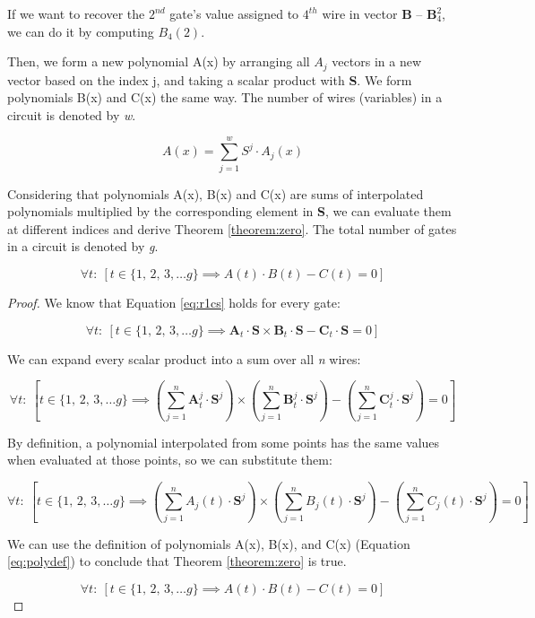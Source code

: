 \begin{exmp}
\label{ex:recover}
If we want to recover the $2^{nd}$ gate's value assigned to $4^{th}$ wire in vector \textbf{B} -- $\textbf{B}_4^2$, we can do it by computing $B_4(2)$.
\end{exmp}

\noindent Then, we form a new polynomial A(x) by arranging all $A_j$ vectors in a new vector based on the index j, and taking a scalar product with \textbf{S}. We form polynomials B(x) and C(x) the same way. The number of wires (variables) in a circuit is denoted by \textit{w}.

\begin{equation}
    \label{eq:polydef}
A(x) = \sum_{j = 1}^{w} S^j \cdot A_j(x)
\end{equation}

\noindent Considering that polynomials A(x), B(x) and C(x) are sums of interpolated polynomials multiplied by the corresponding element in \textbf{S}, we can evaluate them at different indices and derive Theorem \ref{theorem:zero}. The total number of gates in a circuit is denoted by \textit{g}.



\begin{theorem}
    \label{theorem:zero}
    $$\forall t:\: [t \in \{1,\,2,\,3, \dots g\} \implies A(t) \cdot B(t) - C(t) = 0]$$
\end{theorem}

\begin{proof}
    We know that Equation \ref{eq:r1cs} holds for every gate:

    $$\forall t:\: [t \in \{1,\,2,\,3, \dots g\} \implies \textbf{A}_t \cdot \textbf{S} \times \textbf{B}_t \cdot \textbf{S} - \textbf{C}_t \cdot \textbf{S} = 0]$$

    \noindent We can expand every scalar product into a sum over all \textit{n} wires:

    $$\forall t:\: [t \in \{1,\,2,\,3, \dots g\} \implies (\sum_{j = 1}^{n} \textbf{A}_t^j \cdot \textbf{S}^j) \times (\sum_{j = 1}^{n} \textbf{B}_t^j \cdot \textbf{S}^j) - (\sum_{j = 1}^{n} \textbf{C}_t^j \cdot \textbf{S}^j) = 0]$$

    \noindent By definition, a polynomial interpolated from some points has the same values when evaluated at those points, so we can substitute them:

    $$\forall t:\: [t \in \{1,\,2,\,3, \dots g\} \implies (\sum_{j = 1}^{n} A_j(t) \cdot \textbf{S}^j) \times (\sum_{j = 1}^{n} B_j(t) \cdot \textbf{S}^j) - (\sum_{j = 1}^{n} C_j(t) \cdot \textbf{S}^j) = 0]$$

    \noindent We can use the definition of polynomials A(x), B(x), and C(x) (Equation \ref{eq:polydef}) to conclude that Theorem \ref{theorem:zero} is true.

    $$\forall t:\: [t \in \{1,\,2,\,3, \dots g\} \implies A(t) \cdot B(t) - C(t) = 0]$$

\end{proof}

